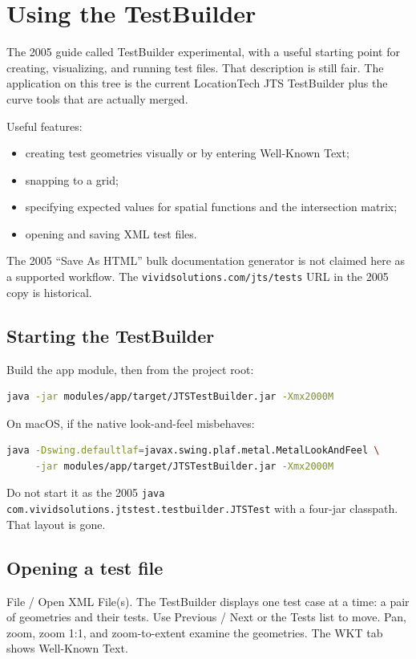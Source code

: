 \documentclass[11pt]{article}
\begin{document}
\section{Using the TestBuilder}
\label{sec:tb}
The 2005 guide called TestBuilder experimental, with a useful starting
point for creating, visualizing, and running test files. That
description is still fair. The application on this tree is the
current LocationTech JTS TestBuilder plus the curve tools that are
actually merged.

Useful features:
\begin{itemize}
  \item creating test geometries visually or by entering Well-Known
        Text;
  \item snapping to a grid;
  \item specifying expected values for spatial functions and the
        intersection matrix;
  \item opening and saving XML test files.
\end{itemize}

The 2005 ``Save As HTML'' bulk documentation generator is not claimed
here as a supported workflow. The \texttt{vividsolutions.com/jts/tests}
URL in the 2005 copy is historical.

\subsection{Starting the TestBuilder}
Build the app module, then from the project root:

\begin{lstlisting}[language=bash]
java -jar modules/app/target/JTSTestBuilder.jar -Xmx2000M
\end{lstlisting}

On macOS, if the native look-and-feel misbehaves:

\begin{lstlisting}[language=bash]
java -Dswing.defaultlaf=javax.swing.plaf.metal.MetalLookAndFeel \
     -jar modules/app/target/JTSTestBuilder.jar -Xmx2000M
\end{lstlisting}

Do not start it as the 2005
\texttt{java com.vividsolutions.jtstest.testbuilder.JTSTest} with a
four-jar classpath. That layout is gone.

\subsection{Opening a test file}
File / Open XML File(s). The TestBuilder displays one test case at a
time: a pair of geometries and their tests. Use Previous / Next or
the Tests list to move. Pan, zoom, zoom 1:1, and zoom-to-extent
examine the geometries. The WKT tab shows Well-Known Text.
\end{document}
